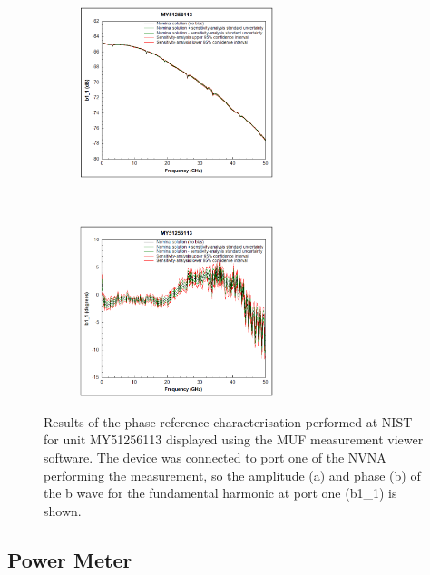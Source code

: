 \documentclass[../thesis/thesis.tex]{subfiles}
\begin{document}
\begin{refsection}
\begin{figure}
	\centering
	\begin{subfigure}{\textwidth}
		\centering
		\includegraphics[width=0.62\textwidth]{combuncA.png}
		\caption{ }
	\end{subfigure}
	\\
	\begin{subfigure}{\textwidth}
		\centering
		\includegraphics[width=0.62\textwidth]{combuncP.png}
		\caption{ }
	\end{subfigure}
	\caption{Results of the phase reference characterisation performed at NIST for unit MY51256113 displayed using the MUF measurement viewer software. The device was connected to port one of the NVNA performing the measurement, so the amplitude (a) and phase (b) of the b wave for the fundamental harmonic at port one (b1\_1) is shown.}
	\label{ch4_fig_combunc}
\end{figure}

\subsection{Power Meter}


\end{refsection}
\end{document}
